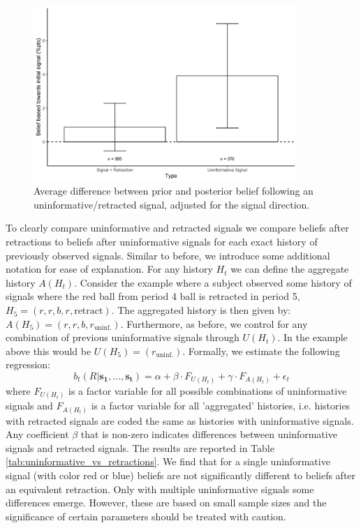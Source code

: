 \documentclass{article}
\begin{document}
\begin{figure}[!htb]
    \centering
    \includegraphics[width=10cm]{Fig/02_fig_retract_vs_uninformative.jpg}
    \caption{Average difference between prior and posterior belief following an uninformative/retracted signal, adjusted for the signal direction.}
    \label{fig:uninformative_vs_retract}
\end{figure}

To clearly compare uninformative and retracted signals we compare beliefs after retractions to beliefs after uninformative signals for each exact history of previously observed signals. Similar to before, we introduce some additional notation for ease of explanation. For any history $H_t$ we can define the aggregate history $A(H_t)$. Consider the example where a subject observed some history of signals where the red ball from period 4 ball is retracted in period 5, $H_5=(r,r,b,r,\text{retract})$. The aggregated history is then given by: $A(H_5)=(r,r,b,r_\text{uninf.})$. Furthermore, as before, we control for any combination of previous uninformative signals through $U(H_t)$. In the example above this would be $U(H_5)=(r_\text{uninf.})$. Formally, we estimate the following regression:
\begin{equation}
    b_t(R|\mathbf{s_1},...,\mathbf{s_t})=\alpha + \beta \cdot F_{U(H_t)} + \gamma \cdot F_{A(H_t)} + \epsilon_t
\end{equation}
where $F_{U(H_t)}$ is a factor variable for all possible combinations of uninformative signals and $F_{A(H_t)}$ is a factor variable for all 'aggregated' histories, i.e.  histories with retracted signals are coded the same as histories with uninformative signals. Any coefficient $\beta$ that is non-zero indicates differences between uninformative signals and retracted signals. The results are reported in Table \ref{tab:uninformative_vs_retractions}. We find that for a single uninformative signal (with color red or blue) beliefs are not significantly different to beliefs after an equivalent retraction. Only with multiple uninformative signals some differences emerge. However, these are based on small sample sizes and the significance of certain parameters should be treated with caution.
\end{document}
